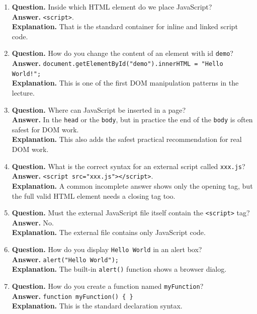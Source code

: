 \documentclass[11pt,a4paper]{article}
\begin{document}
\begin{enumerate}
  \item \textbf{Question.} Inside which HTML element do we place JavaScript?\\
  \textbf{Answer.} \texttt{<script>}.\\
  \textbf{Explanation.} That is the standard container for inline and linked script code.

  \item \textbf{Question.} How do you change the content of an element with id \texttt{demo}?\\
  \textbf{Answer.} \texttt{document.getElementById("demo").innerHTML = "Hello World!";}\\
  \textbf{Explanation.} This is one of the first DOM manipulation patterns in the lecture.

  \item \textbf{Question.} Where can JavaScript be inserted in a page?\\
  \textbf{Answer.} In the \texttt{head} or the \texttt{body}, but in practice the end of the \texttt{body} is often safest for DOM work.\\
  \textbf{Explanation.} This also adds the safest practical recommendation for real DOM work.

  \item \textbf{Question.} What is the correct syntax for an external script called \texttt{xxx.js}?\\
  \textbf{Answer.} \texttt{<script src="xxx.js"></script>}.\\
  \textbf{Explanation.} A common incomplete answer shows only the opening tag, but the full valid HTML element needs a closing tag too.

  \item \textbf{Question.} Must the external JavaScript file itself contain the \texttt{<script>} tag?\\
  \textbf{Answer.} No.\\
  \textbf{Explanation.} The external file contains only JavaScript code.

  \item \textbf{Question.} How do you display \texttt{Hello World} in an alert box?\\
  \textbf{Answer.} \texttt{alert("Hello World");}\\
  \textbf{Explanation.} The built-in \texttt{alert()} function shows a browser dialog.

  \item \textbf{Question.} How do you create a function named \texttt{myFunction}?\\
  \textbf{Answer.} \texttt{function myFunction() \{ \}}\\
  \textbf{Explanation.} This is the standard declaration syntax.


\end{enumerate}
\end{document}
